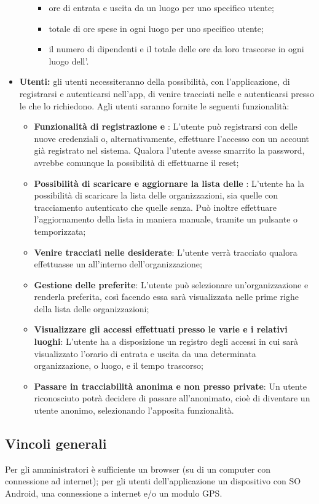 \begin{itemize}
\begin{itemize}
            \begin{itemize}
                \item ore di entrata e uscita da un luogo per uno specifico utente;
                \item totale di ore spese in ogni luogo per uno specifico utente;
                \item il numero di dipendenti e il totale delle ore da loro trascorse in ogni luogo dell'.
            \end{itemize}
        \end{itemize}
    \item \textbf{Utenti:} gli utenti necessiteranno della possibilità, con l'applicazione, di registrarsi e autenticarsi nell'app, di venire tracciati nelle  e autenticarsi presso le  che lo richiedono. Agli utenti saranno fornite le seguenti funzionalità:
    \begin{itemize}
        \item \textbf{Funzionalità di registrazione e }: L'utente può registrarsi con delle nuove credenziali o, alternativamente, effettuare l'accesso con un account già registrato nel sistema. Qualora l'utente avesse smarrito la password, avrebbe comunque la possibilità di effettuarne il reset;
        \item \textbf{Possibilità di scaricare e aggiornare la lista delle }: L'utente ha la possibilità di scaricare la lista delle organizzazioni, sia quelle con tracciamento autenticato che quelle senza. Può inoltre effettuare l'aggiornamento della lista in maniera manuale, tramite un pulsante o temporizzata;
        \item \textbf{Venire tracciati nelle  desiderate}: L'utente verrà tracciato qualora effettuasse un  all'interno dell'organizzazione;
        \item \textbf{Gestione delle  preferite}: L'utente può selezionare un'organizzazione e renderla preferita, così facendo essa sarà visualizzata nelle prime righe della lista delle organizzazioni;
        \item \textbf{Visualizzare gli accessi effettuati presso le varie  e i relativi luoghi}: L'utente ha a disposizione un registro degli accessi in cui sarà visualizzato l'orario di entrata e uscita da una determinata organizzazione, o luogo, e il tempo trascorso;
        \item \textbf{Passare in tracciabilità anonima e non presso  private}: Un utente riconosciuto potrà decidere di passare all'anonimato, cioè di diventare un utente anonimo, selezionando l'apposita funzionalità.
    \end{itemize}
\end{itemize}
\subsection{Vincoli generali}
Per gli amministratori è sufficiente un browser (su di un computer con connessione ad internet); per gli utenti dell'applicazione un dispositivo con SO Android, una connessione a internet e/o un modulo GPS.